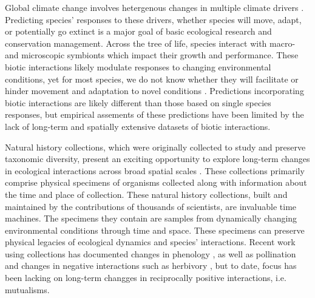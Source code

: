\documentclass[11pt]{article}
\begin{document}
Global climate change involves hetergenous changes in multiple climate drivers \citep{IPCC2012managing}. 
Predicting species' responses to these drivers, whether species will move, adapt, or potentially go extinct is a major goal of basic ecological research and conservation management. 
Across the tree of life, species interact with macro- and microscopic symbionts which impact their growth and performance. 
These biotic interactions likely modulate responses to changing environmental conditions, yet for most species, we do not know whether they will facilitate or hinder movement and adaptation to novel conditions \cite{gilman2010framework}. Predictions incorporating biotic interactions are likely different than those based on single species responses, but empirical assements of these predictions have been limited by the lack of long-term and spatially extensive datasets of biotic interactions.

Natural history collections, which were originally collected to study and preserve taxonomic diversity, present an exciting opportunity to explore long-term changes in ecological interactions across broad spatial scales \citep{meineke2018unrealized}. 
These collections primarily comprise physical specimens of organisms collected along with information about the time and place of collection. 
These natural history collections, built and maintained by the contributions of thousands of scientists, are invaluable time machines. 
The specimens they contain are samples from dynamically changing environmental conditions through time and space.
These specimens can preserve physical legacies of ecological dynamics and species' interactions. 
Recent work using collections has documented changes in phenology \citep{willis2017old, park2019herbarium, berg2019examination}, as well as pollination \citep{pauw2011reconstruction, duan2019century} and changes in negative interactions such as herbivory \citep{meineke2019herbarium}, but to date, focus has been lacking on long-term changges in reciprocally positive interactions, i.e. mutualisms. 
\end{document}
